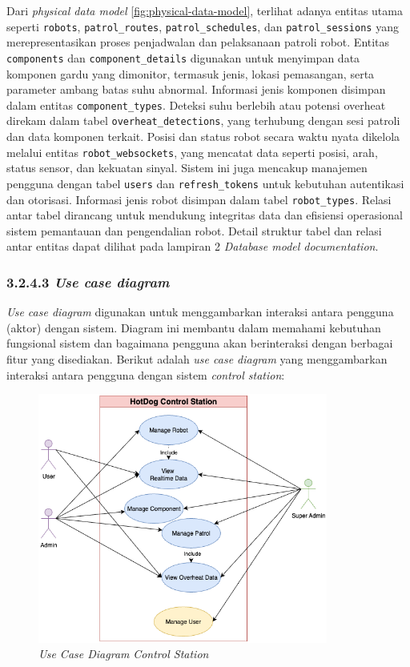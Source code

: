 Dari \emph{physical data model} \ref{fig:physical-data-model}, terlihat adanya entitas utama seperti \texttt{robots}, \texttt{patrol\_routes}, \texttt{patrol\_schedules}, dan \texttt{patrol\_sessions} yang merepresentasikan proses penjadwalan dan pelaksanaan patroli robot. Entitas \texttt{components} dan \texttt{component\_details} digunakan untuk menyimpan data komponen gardu yang dimonitor, termasuk jenis, lokasi pemasangan, serta parameter ambang batas suhu abnormal. Informasi jenis komponen disimpan dalam entitas \texttt{component\_types}. Deteksi suhu berlebih atau potensi overheat direkam dalam tabel \texttt{overheat\_detections}, yang terhubung dengan sesi patroli dan data komponen terkait. Posisi dan status robot secara waktu nyata dikelola melalui entitas \texttt{robot\_websockets}, yang mencatat data seperti posisi, arah, status sensor, dan kekuatan sinyal. Sistem ini juga mencakup manajemen pengguna dengan tabel \texttt{users} dan \texttt{refresh\_tokens} untuk kebutuhan autentikasi dan otorisasi. Informasi jenis robot disimpan dalam tabel \texttt{robot\_types}. Relasi antar tabel dirancang untuk mendukung integritas data dan efisiensi operasional sistem pemantauan dan pengendalian robot. Detail struktur tabel dan relasi antar entitas dapat dilihat pada lampiran 2 \emph{Database model documentation}.

\subsubsection{3.2.4.3 \emph{Use case diagram}}
\emph{Use case diagram} digunakan untuk menggambarkan interaksi antara pengguna (aktor) dengan sistem. Diagram ini membantu dalam memahami kebutuhan fungsional sistem dan bagaimana pengguna akan berinteraksi dengan berbagai fitur yang disediakan. Berikut adalah \emph{use case diagram} yang menggambarkan interaksi antara pengguna dengan sistem \emph{control station}:

\begin{figure}[H]
  \centering
  \includegraphics[width=0.85\textwidth]{gambar/bab3/usecase.png}
  \caption{\emph{Use Case Diagram} \emph{Control Station}}
  \label{fig:use-case-diagram}
\end{figure}

